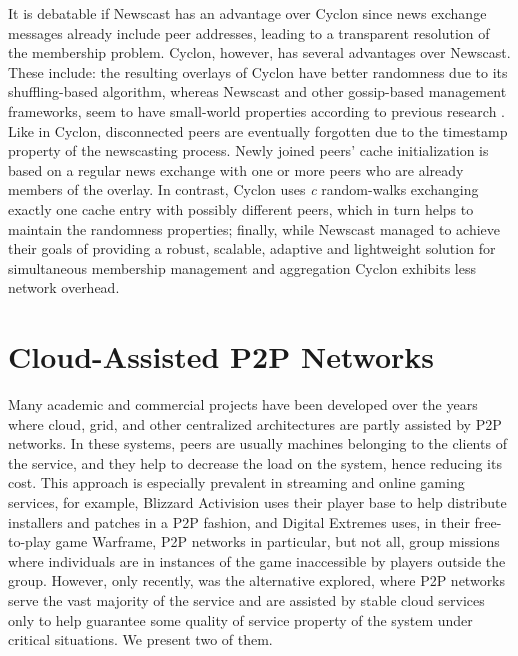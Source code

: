 \documentclass[runningheads]{llncs}
\begin{document}
It is debatable if Newscast has an advantage over Cyclon since news exchange messages already include peer addresses, leading to a transparent resolution of the membership problem. Cyclon, however, has several advantages over Newscast. These include: the resulting overlays of Cyclon have better randomness due to its shuffling-based algorithm, whereas Newscast and other gossip-based management frameworks, seem to have small-world properties according to previous research \cite{eval-gossip-based}. Like in Cyclon, disconnected peers are eventually forgotten due to the timestamp property of the newscasting process. Newly joined peers' cache initialization is based on a regular news exchange with one or more peers who are already members of the overlay. In contrast, Cyclon uses \textit{c} random-walks exchanging exactly one cache entry with possibly different peers, which in turn helps to maintain the randomness properties; finally, while Newscast managed to achieve their goals of providing a robust, scalable, adaptive and lightweight solution for simultaneous membership management and aggregation Cyclon exhibits less network overhead\cite{cyclon}.

\section{Cloud-Assisted P2P Networks}\label{sec:ca-networks}

Many academic and commercial projects have been developed over the years where cloud, grid, and other centralized architectures are partly assisted by P2P networks. In these systems, peers are usually machines belonging to the clients of the service, and they help to decrease the load on the system, hence reducing its cost. This approach is especially prevalent in streaming and online gaming services, for example, Blizzard Activision uses their player base to help distribute installers and patches in a P2P fashion, and Digital Extremes uses, in their free-to-play game Warframe, P2P networks in particular, but not all, group missions where individuals are in instances of the game inaccessible by players outside the group. However, only recently, was the alternative explored, where P2P networks serve the vast majority of the service and are assisted by stable cloud services only to help guarantee some quality of service property of the system under critical situations. We present two of them.
\end{document}
